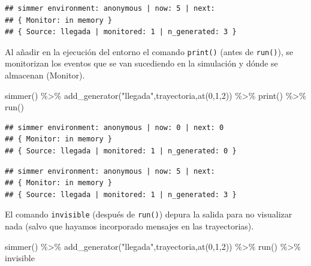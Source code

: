 \documentclass[
]{book}
\newenvironment{Shaded}{\begin{snugshade}}{\end{snugshade}}
\newcommand{\DecValTok}[1]{\textcolor[rgb]{0.00,0.00,0.81}{#1}}
\newcommand{\FunctionTok}[1]{\textcolor[rgb]{0.00,0.00,0.00}{#1}}
\newcommand{\NormalTok}[1]{#1}
\newcommand{\SpecialCharTok}[1]{\textcolor[rgb]{0.00,0.00,0.00}{#1}}
\newcommand{\StringTok}[1]{\textcolor[rgb]{0.31,0.60,0.02}{#1}}
\theoremstyle{definition}
\theoremstyle{definition}
\theoremstyle{definition}
\theoremstyle{definition}
\theoremstyle{remark}
\begin{document}
\begin{verbatim}
## simmer environment: anonymous | now: 5 | next: 
## { Monitor: in memory }
## { Source: llegada | monitored: 1 | n_generated: 3 }
\end{verbatim}

Al añadir en la ejecución del entorno el comando \texttt{print()} (antes de \texttt{run()}), se monitorizan los eventos que se van sucediendo en la simulación y dónde se almacenan (Monitor).

\begin{Shaded}
\begin{Highlighting}[]
\FunctionTok{simmer}\NormalTok{() }\SpecialCharTok{\%\textgreater{}\%}
  \FunctionTok{add\_generator}\NormalTok{(}\StringTok{"llegada"}\NormalTok{,trayectoria,}\FunctionTok{at}\NormalTok{(}\DecValTok{0}\NormalTok{,}\DecValTok{1}\NormalTok{,}\DecValTok{2}\NormalTok{)) }\SpecialCharTok{\%\textgreater{}\%}
  \FunctionTok{print}\NormalTok{() }\SpecialCharTok{\%\textgreater{}\%}
  \FunctionTok{run}\NormalTok{() }
\end{Highlighting}
\end{Shaded}

\begin{verbatim}
## simmer environment: anonymous | now: 0 | next: 0
## { Monitor: in memory }
## { Source: llegada | monitored: 1 | n_generated: 0 }
\end{verbatim}

\begin{verbatim}
## simmer environment: anonymous | now: 5 | next: 
## { Monitor: in memory }
## { Source: llegada | monitored: 1 | n_generated: 3 }
\end{verbatim}

El comando \texttt{invisible} (después de \texttt{run()}) depura la salida para no visualizar nada (salvo que hayamos incorporado mensajes en las trayectorias).

\begin{Shaded}
\begin{Highlighting}[]
\FunctionTok{simmer}\NormalTok{() }\SpecialCharTok{\%\textgreater{}\%}
  \FunctionTok{add\_generator}\NormalTok{(}\StringTok{"llegada"}\NormalTok{,trayectoria,}\FunctionTok{at}\NormalTok{(}\DecValTok{0}\NormalTok{,}\DecValTok{1}\NormalTok{,}\DecValTok{2}\NormalTok{)) }\SpecialCharTok{\%\textgreater{}\%}
  \FunctionTok{run}\NormalTok{() }\SpecialCharTok{\%\textgreater{}\%}
\NormalTok{  invisible}
\end{Highlighting}
\end{Shaded}
\end{document}
